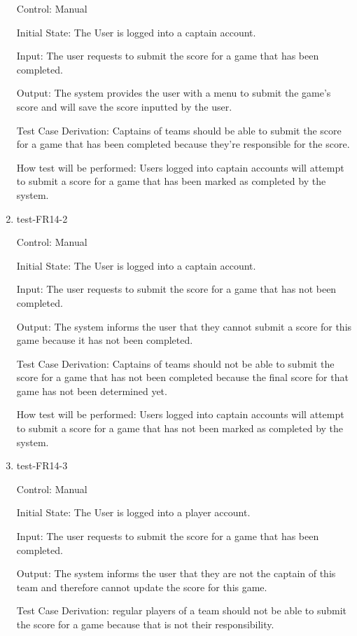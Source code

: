 \documentclass[12pt, titlepage]{article}
\begin{document}
\begin{enumerate}
  Control: Manual
           
  Initial State: The User is logged into a captain account.
           
  Input: The user requests to submit the score for a game that has been
  completed.
           
  Output: The system provides the user with a menu to submit the game's
  score and will save the score inputted by the user.
 
  Test Case Derivation: Captains of teams should be able to submit the score
  for a game that has been completed because they're responsible for the
  score.
 
  How test will be performed: Users logged into captain accounts will attempt
  to submit a score for a game that has been marked as completed by the system.

  \item{test-FR14-2\\}

  Control: Manual
           
  Initial State: The User is logged into a captain account.
           
  Input: The user requests to submit the score for a game that has not
  been completed.
           
  Output: The system informs the user that they cannot submit a score
  for this game because it has not been completed.
 
  Test Case Derivation: Captains of teams should not be able to 
  submit the score for a game that has not been completed because 
  the final score for that game has not been determined yet.
 
  How test will be performed: Users logged into captain accounts will attempt
  to submit a score for a game that has not been marked as completed by 
  the system.

  \item{test-FR14-3\\}

  Control: Manual
           
  Initial State: The User is logged into a player account.
           
  Input: The user requests to submit the score for a game that has
  been completed.
           
  Output: The system informs the user that they are not the captain 
  of this team and therefore cannot update the score for this game.
 
  Test Case Derivation: regular players of a team should not be able to 
  submit the score for a game because that is not their responsibility.
 

\end{enumerate}
\end{document}
